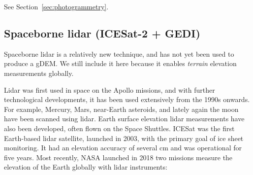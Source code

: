 See Section~\ref{sec:photogrammetry}.




\subsection{Spaceborne lidar (ICESat-2 + GEDI)}%

Spaceborne lidar is a relatively new technique, and has not yet been used to produce a gDEM.
We still include it here because it enables \emph{terrain} elevation measurements globally.

Lidar was first used in space on the Apollo missions, and with further technological developments, it has been used extensively from the 1990s onwards.
For example, Mercury, Mars, near-Earth asteroids, and lately again the moon have been scanned using lidar.
Earth surface elevation lidar measurements have also been developed, often flown on the Space Shuttles.
ICESat was the first Earth-based lidar satellite, launched in 2003, with the primary goal of ice sheet monitoring.
It had an elevation accuracy of several cm and was operational for five years.
Most recently, NASA launched in 2018 two missions measure the elevation of the Earth globally with lidar instruments:

